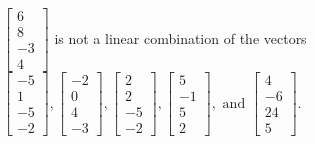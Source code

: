 \begin{exercise}
\begin{exerciseStatement}
  \end{exerciseStatement}
  \begin{exerciseAnswer}
   \(\left[\begin{array}{c}
6 \\
8 \\
-3 \\
4
\end{array}\right]\) 
  	 is not  
	a linear combination of the vectors \(\left[\begin{array}{c}
-5 \\
1 \\
-5 \\
-2
\end{array}\right] , \left[\begin{array}{c}
-2 \\
0 \\
4 \\
-3
\end{array}\right] , \left[\begin{array}{c}
2 \\
2 \\
-5 \\
-2
\end{array}\right] , \left[\begin{array}{c}
5 \\
-1 \\
5 \\
2
\end{array}\right] , \text{ and } \left[\begin{array}{c}
4 \\
-6 \\
24 \\
5
\end{array}\right]\).

	
  


  \end{exerciseAnswer}
\end{exercise}